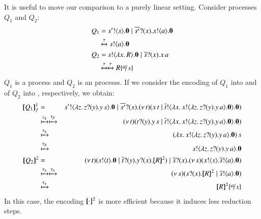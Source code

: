 \documentclass[preprint,11pt]{elsarticle}
\begin{document}
{{It is useful to move our comparison 
to a purely linear setting. %
Consider processes $Q_1$ and $Q_2$:
\begin{align*}
	Q_1  & =  \bout{s'}{s} \inact \Par \binp{\dual{s'}}{x} \bout{x}{a} \inact
	\\
	& \hby{\tau}
	\bout{s}{a} \inact 
	\\
	Q_2 & =  \bout{s}{\abs{x}{R}} \inact \Par \binp{\dual{s}}{x} \appl{x}{a}
	\\
	& \hby{\tau}
	\hby{\tau}
	R \subst{a}{x}
\end{align*}
$Q_1$ is a \sessp process and $Q_2$ is an \HO processs.
If we consider the encoding of $Q_1$ into \HO and of $Q_2$ into \sessp, respectively, 
we obtain:
\begin{eqnarray*}
	\map{Q_1}_f^{1} & = & \bout{s'}{\abs{z}{\binp{z}{y} \appl{y}{s}}} \inact \Par \binp{\dual{s'}}{x} \newsp{t}{\appl{x}{t} \Par \bout{\dual{t}}{\abs{x}{\bout{x}{\abs{z}{\binp{z}{y} \appl{y}{a}}} \inact}} \inact}\\
	& \hby{\stau} \hby{\btau}& 
	\newsp{t}{\binp{t}{y} \appl{y}{s} \Par \bout{\dual{t}}{\abs{x}{\bout{x}{\abs{z}{\binp{z}{y} \appl{y}{a}}} \inact}} \inact}\\
	& \hby{\stau} & 
	\appl{(\abs{x}{\bout{x}{\abs{z}{\binp{z}{y} \appl{y}{a}}} \inact})}{s}
	\\
	& \hby{\btau} & 
	\bout{s}{\abs{z}{\binp{z}{y} \appl{y}{a}}} \inact \\
	\pmap{Q_2}{2} & = & \newsp{t}{\bout{s}{t} \inact \Par \binp{\dual{t}}{y} \binp{y}{x} \pmap{R}{2}} \Par \binp{\dual{s}}{x} \newsp{s}{\bout{x}{s} \bout{\dual{s}}{a} \inact}
	\\
	& \hby{\stau} \hby{\stau} & 
	\newsp{s}{\binp{s}{x} \pmap{R}{2} \Par \bout{\dual{s}}{a} \inact}
	\\
	& \hby{\stau} &
	\pmap{R}{2}\subst{a}{x}
\end{eqnarray*}
In this case, the encoding $[\!\![\cdot]\!\!]^2$ is more efficient because it induces less reduction steps.
}}
\end{document}
